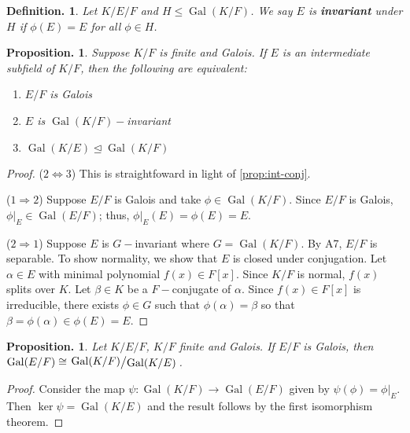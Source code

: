 \documentclass[11pt, a4paper]{memoir}
\newcommand{\mbf}[1]{{\boldmath\bfseries #1}}
\newcommand{\imp}[2]{($#1\Rightarrow#2$)\hspace{0.2cm}}
\newcommand{\impe}[2]{($#1\Leftrightarrow#2$)\hspace{0.2cm}}
\theoremstyle{change}
\newtheorem{proposition}[theorem]{Proposition.}
\theoremstyle{plain}
\theoremstyle{nonumberplain}
\newtheorem{definition}{Definition.}
\newtheorem{proof}{Proof}
\DeclareMathOperator{\Gal}{Gal}
\newcommand{\quot}[2]{\mathchoice{\left.\raisebox{0.14em}{$#1$}\middle/\raisebox{-0.14em}{$#2$}\right.}
                                 {\left.\raisebox{0.08em}{$#1$}\middle/\raisebox{-0.08em}{$#2$}\right.}
                                 {\left.\raisebox{0.03em}{$#1$}\middle/\raisebox{-0.03em}{$#2$}\right.}
                                 {\left.\raisebox{0em}{$#1$}\middle/\raisebox{0em}{$#2$}\right.}}
\numberwithin{equation}{section}
\begin{document}
\begin{definition}
    Let $K/E/F$ and $H\leq\Gal(K/F)$.
    We say $E$ is \mbf{invariant} under $H$ if $\phi(E)=E$ for all $\phi\in H$.
\end{definition}
\begin{proposition}
    Suppose $K/F$ is finite and Galois.
    If $E$ is an intermediate subfield of $K/F$, then the following are equivalent:
    \begin{enumerate}[nolistsep]
        \item $E/F$ is Galois
        \item $E$ is $\Gal(K/F)-$invariant
        \item $\Gal(K/E)\trianglelefteq\Gal(K/F)$
    \end{enumerate}
\end{proposition}
\begin{proof}
    \impe{2}{3}
    This is straightfoward in light of \cref{prop:int-conj}.

    \imp{1}{2}
    Suppose $E/F$ is Galois and take $\phi\in\Gal(K/F)$.
    Since $E/F$ is Galois, $\phi|_E\in\Gal(E/F)$; thus, $\phi|_E(E)=\phi(E)=E$.

    \imp{2}{1}
    Suppose $E$ is $G-$invariant where $G=\Gal(K/F)$.
    By A7, $E/F$ is separable.
    To show normality, we show that $E$ is closed under conjugation.
    Let $\alpha\in E$ with minimal polynomial $f(x)\in F[x]$.
    Since $K/F$ is normal, $f(x)$ splits over $K$.
    Let $\beta\in K$ be a $F-$conjugate of $\alpha$.
    Since $f(x)\in F[x]$ is irreducible, there exists $\phi\in G$ such that $\phi(\alpha)=\beta$ so that $\beta=\phi(\alpha)\in\phi(E)=E$.
\end{proof}
\begin{proposition}
    Let $K/E/F$, $K/F$ finite and Galois.
    If $E/F$ is Galois, then $\Gal(E/F)\cong\quot{\Gal(K/F)}{\Gal(K/E)}$.
\end{proposition}
\begin{proof}
    Consider the map $\psi:\Gal(K/F)\to\Gal(E/F)$ given by $\psi(\phi)=\phi|_E$.
    Then $\ker\psi=\Gal(K/E)$ and the result follows by the first isomorphism theorem.
\end{proof}
\end{document}
